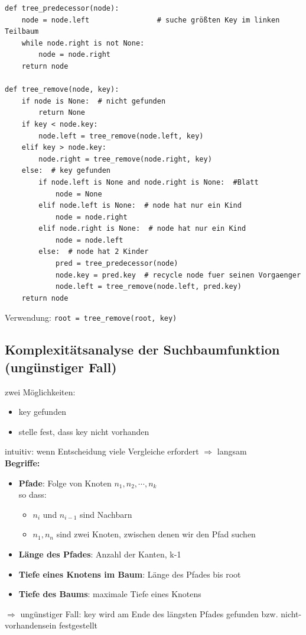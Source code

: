 \begin{verbatim}
def tree_predecessor(node):
    node = node.left                # suche größten Key im linken Teilbaum
    while node.right is not None:
        node = node.right
    return node

def tree_remove(node, key):
    if node is None:  # nicht gefunden
        return None
    if key < node.key:
        node.left = tree_remove(node.left, key)
    elif key > node.key:
        node.right = tree_remove(node.right, key)
    else:  # key gefunden
        if node.left is None and node.right is None:  #Blatt
            node = None
        elif node.left is None:  # node hat nur ein Kind
            node = node.right
        elif node.right is None:  # node hat nur ein Kind
            node = node.left
        else:  # node hat 2 Kinder
            pred = tree_predecessor(node)
            node.key = pred.key  # recycle node fuer seinen Vorgaenger
            node.left = tree_remove(node.left, pred.key)
    return node
\end{verbatim}

Verwendung: \verb|root = tree_remove(root, key)|


\subsection*{Komplexitätsanalyse der Suchbaumfunktion (ungünstiger Fall)}
zwei Möglichkeiten:
\begin{itemize}
    \item key gefunden
    \item stelle fest, dass key nicht vorhanden
\end{itemize}
intuitiv: wenn Entscheidung viele Vergleiche erfordert $\Rightarrow$ langsam \\
\textbf{Begriffe:}
\begin{itemize}
    \item \textbf{Pfade}: Folge von Knoten $n_1, n_2, \cdots, n_k$ \\
    so dass:
    \begin{itemize}
        \item $n_i$ und $n_{i-1}$ sind Nachbarn
        \item $n_1, n_n$ sind zwei Knoten, zwischen denen wir den Pfad suchen
    \end{itemize}
    \item \textbf{Länge des Pfades}: Anzahl der Kanten, k-1
    \item \textbf{Tiefe eines Knotens im Baum}: Länge des Pfades bis root
    \item \textbf{Tiefe des Baums}: maximale Tiefe eines Knotens
\end{itemize}
$\Rightarrow$ ungünstiger Fall: key wird am Ende des längsten Pfades gefunden bzw. nicht-vorhandensein festgestellt


